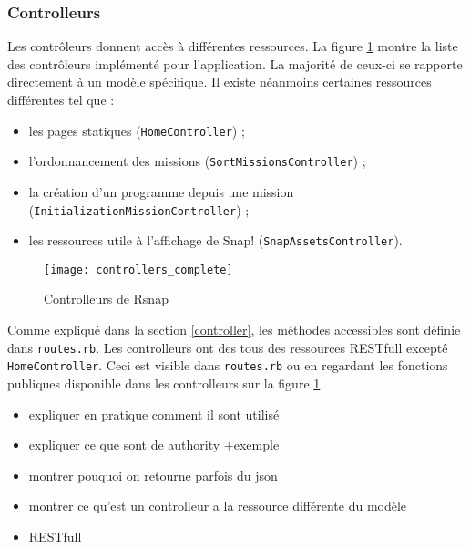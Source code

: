 \subsubsection{Controlleurs}
Les contrôleurs donnent accès à différentes ressources. La figure \ref{fig:controllers} montre la liste des contrôleurs implémenté pour l'application. La majorité de ceux-ci se rapporte directement à un modèle spécifique. Il existe néanmoins certaines ressources différentes tel que : 
\begin{itemize}
  \item les pages statiques (\texttt{HomeController}) ;
  \item l'ordonnancement des missions (\texttt{SortMissionsController}) ; 
  \item la création d'un programme depuis une mission (\texttt{InitializationMissionController}) ;
  \item les ressources utile à l'affichage de Snap! (\texttt{SnapAssetsController}).
\end{itemize}
\begin{figure}
  \begin{center}
    \texttt{[image: controllers\_complete]}
    \caption{Controlleurs de Rsnap}
    \label{fig:controllers}
  \end{center}
\end{figure}

Comme expliqué dans la section \ref{controller}, les méthodes accessibles sont définie dans \texttt{routes.rb}. Les controlleurs ont des tous des ressources RESTfull excepté \texttt{HomeController}. Ceci est visible dans \texttt{routes.rb} ou en regardant les fonctions publiques disponible dans les controlleurs sur la figure \ref{fig:controllers}.

\begin{otherlanguage}{english}

\end{otherlanguage}

\begin{itemize}
  \item expliquer en pratique comment il sont utilisé
  \item expliquer ce que sont de authority +exemple
  \item montrer pouquoi on retourne parfois du json
  \item montrer ce qu'est un controlleur a la ressource différente du modèle
  \item RESTfull
\end{itemize}

